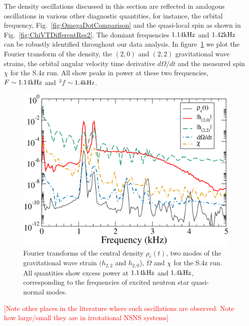 \documentclass[aps,prd,amsmath,floatfix
,twocolumn
,superscriptaddress,nofootinbib,showpacs]{revtex4-1}
\theoremstyle{plain} \newtheorem{thm}{Theorem} \newtheorem{lem}{Lemma}
\newcommand{\red}[1]{\textcolor{Red}{#1}}
\begin{document}
The density oscillations discussed in this section are reflected in
analogous oscillations in various other diagnostic quantities, for
instance, the orbital frequency, Fig.~\ref{fig:OmegaDotComparison} and
the quasi-local spin as shown in Fig.~\ref{fig:ChiVTDifferentRes2}.
The domiant frequencies $1.14\rm{kHz}$ and $1.42\rm{kHz}$ can be
robustly identified throughout our data analysis. In
figure~\ref{fig:ManyQuantities} we plot the Fourier transform of the
density, the $(2,0)$ and $(2,2)$ gravitational wave strains, the
orbital angular velocity time derivative $d\Omega/dt$ and the
measured spin $\chi$ for the S.4z run. All show peaks in power at
these two frequencies, $F\sim1.14\rm{kHz}$ and $^2f\sim1.4\rm{kHz}$.


\begin{figure}
\includegraphics[width=0.95\columnwidth]{ManyQuantities}
\caption{\label{fig:ManyQuantities} Fourier transforms of the central
  density $\rho_c(t)$, two modes of the gravitational wave strain
  $(h_{2,2}$ and $h_{2,0}$), $\dot{\Omega}$ and $\chi$ for the S.4z
  run.  All quantities show excess power at $1.14\rm{kHz}$ and
  $1.4\rm{kHz}$, corresponding to the frequencies of excited neutron
  star quasi-normal modes.}
\end{figure}


\red{[Note other places in the literature where such oscillations are
  observed.  Note how large/small they are in irrotational NSNS
  systems]}

\end{document}
